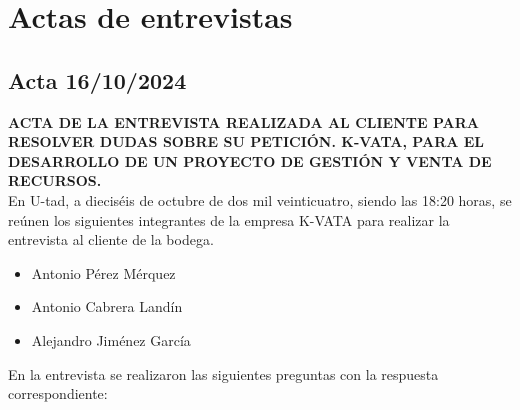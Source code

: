 \chapter{Actas de entrevistas}

\section{Acta 16/10/2024}

\textbf{ACTA DE LA ENTREVISTA REALIZADA AL CLIENTE PARA RESOLVER DUDAS SOBRE SU PETICIÓN. K-VATA, PARA EL DESARROLLO DE UN PROYECTO DE GESTIÓN Y VENTA DE RECURSOS.} \\

En U-tad, a dieciséis de octubre de dos mil veinticuatro, siendo las 18:20 horas, se reúnen los siguientes integrantes de la empresa K-VATA para realizar la entrevista al cliente de la bodega.

\begin{itemize}
    \item Antonio Pérez Mérquez
    \item Antonio Cabrera Landín
    \item Alejandro Jiménez García
\end{itemize}

En la entrevista se realizaron las siguientes preguntas con la respuesta correspondiente:

